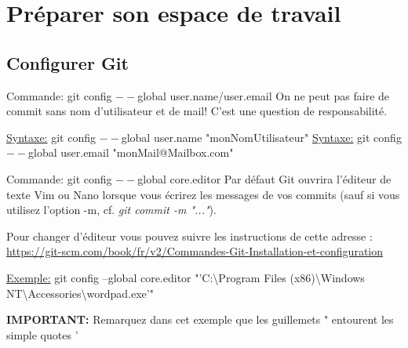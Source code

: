 \documentclass{beamer}
\begin{document}
\section{Préparer son espace de travail}

\subsection{Configurer Git}
\begin{frame}{Commande: git config $--$global user.name/user.email}
On ne peut pas faire de commit sans nom d'utilisateur et de mail! C'est une question de responsabilité.
\medskip

\underline{Syntaxe:} git config $--$global user.name "monNomUtilisateur"
\smallskip
\underline{Syntaxe:} git config $--$global user.email "monMail@Mailbox.com"
\medskip
\end{frame}

\begin{frame}{Commande: git config $--$global core.editor}
Par défaut Git ouvrira l'éditeur de texte Vim ou Nano lorsque vous écrirez les messages de vos commits (sauf si vous utilisez l'option -m, cf. \textit{git commit -m "..."}).\\
\medskip

Pour changer d'éditeur vous pouvez suivre les instructions de cette adresse : \url{https://git-scm.com/book/fr/v2/Commandes-Git-Installation-et-configuration}\\
\medskip

\underline{Exemple:} git config --global core.editor "'C:\textbackslash Program Files (x86)\textbackslash Windows NT\textbackslash Accessories\textbackslash wordpad.exe'"\\
\medskip

\textbf{IMPORTANT:} Remarquez dans cet exemple que les guillemets " entourent les simple quotes ' 
\end{frame}
\end{document}

